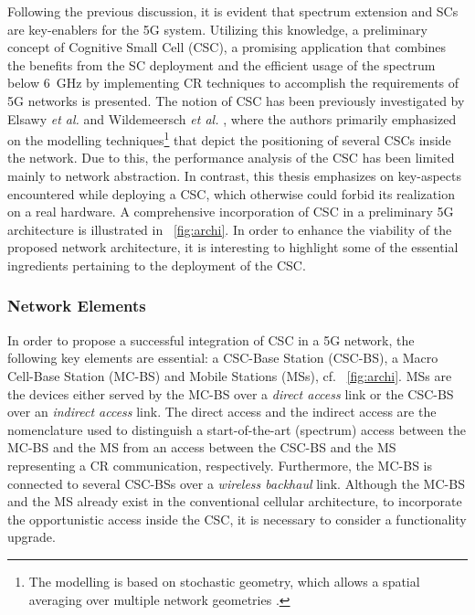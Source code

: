 Following the previous discussion, it is evident that spectrum extension and SCs are key-enablers for the 5G system.
Utilizing this knowledge, a preliminary concept of Cognitive Small Cell (CSC), a promising application that combines the benefits from the SC deployment and the efficient usage of the spectrum below \SI{6}{GHz} by implementing CR techniques to accomplish the requirements of 5G networks is presented. The notion of CSC has been previously investigated by Elsawy \textit{et al.} \cite{Elsawy13, Elsawy13_cmag} and Wildemeersch \textit{et al.} \cite{Wild13}, where the authors primarily emphasized on the modelling techniques\footnote{The modelling is based on stochastic geometry, which allows a spatial averaging over multiple network geometries \cite{Haenggi, Haenggi08now}.} that depict the positioning of several CSCs inside the network. Due to this, the performance analysis of the CSC has been limited mainly to network abstraction. In contrast, this thesis emphasizes on key-aspects encountered while deploying a CSC, which otherwise could forbid its realization on a real hardware. %
 A comprehensive incorporation of CSC in a preliminary 5G architecture is illustrated in \figurename~\ref{fig:archi}. In order to enhance the viability of the proposed network architecture, it is interesting to highlight some of the essential ingredients pertaining to the deployment of the CSC.

\subsubsection*{Network Elements}
 In order to propose a successful integration of CSC in a 5G network, the following key elements are essential: a CSC-Base Station (CSC-BS), a Macro Cell-Base Station (MC-BS) and Mobile Stations (MSs), cf. \figurename~\ref{fig:archi}. MSs are the devices either served by the MC-BS over a \textit{direct access} link or the CSC-BS over an \textit{indirect access} link. The direct access and the indirect access are the nomenclature used to distinguish a start-of-the-art (spectrum) access between the MC-BS and the MS from an access between the CSC-BS and the MS representing a CR communication, respectively. Furthermore, the MC-BS is connected to several CSC-BSs over a \textit{wireless backhaul} link. Although the MC-BS and the MS already exist in the conventional cellular architecture, to incorporate the opportunistic access inside the CSC, it is necessary to consider a functionality upgrade.

